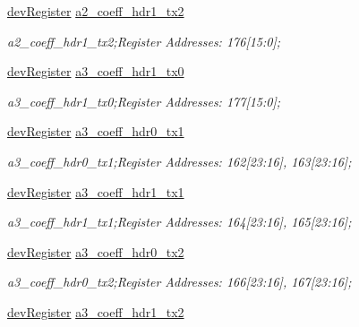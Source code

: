 \begin{DoxyCompactItemize}
\mbox{\hyperlink{classdev_register}{dev\+Register}} \mbox{\hyperlink{class_o_p_t3101_registers_a36a3f5b6e254c0e3b7249b22f0d83378}{a2\+\_\+coeff\+\_\+hdr1\+\_\+tx2}}
\begin{DoxyCompactList}\small\item\em a2\+\_\+coeff\+\_\+hdr1\+\_\+tx2;Register Addresses\+: 176\mbox{[}15\+:0\mbox{]}; \end{DoxyCompactList}\item 
\mbox{\hyperlink{classdev_register}{dev\+Register}} \mbox{\hyperlink{class_o_p_t3101_registers_a2f5467bf81575c1e2cfd24206cdebb65}{a3\+\_\+coeff\+\_\+hdr1\+\_\+tx0}}
\begin{DoxyCompactList}\small\item\em a3\+\_\+coeff\+\_\+hdr1\+\_\+tx0;Register Addresses\+: 177\mbox{[}15\+:0\mbox{]}; \end{DoxyCompactList}\item 
\mbox{\hyperlink{classdev_register}{dev\+Register}} \mbox{\hyperlink{class_o_p_t3101_registers_a30c9afa928337c116a2ab0257cf6c9a0}{a3\+\_\+coeff\+\_\+hdr0\+\_\+tx1}}
\begin{DoxyCompactList}\small\item\em a3\+\_\+coeff\+\_\+hdr0\+\_\+tx1;Register Addresses\+: 162\mbox{[}23\+:16\mbox{]}, 163\mbox{[}23\+:16\mbox{]}; \end{DoxyCompactList}\item 
\mbox{\hyperlink{classdev_register}{dev\+Register}} \mbox{\hyperlink{class_o_p_t3101_registers_a10d71a658f53af9e89e98b4b1643cb09}{a3\+\_\+coeff\+\_\+hdr1\+\_\+tx1}}
\begin{DoxyCompactList}\small\item\em a3\+\_\+coeff\+\_\+hdr1\+\_\+tx1;Register Addresses\+: 164\mbox{[}23\+:16\mbox{]}, 165\mbox{[}23\+:16\mbox{]}; \end{DoxyCompactList}\item 
\mbox{\hyperlink{classdev_register}{dev\+Register}} \mbox{\hyperlink{class_o_p_t3101_registers_a14387bafd3d67825868af4867f303ce7}{a3\+\_\+coeff\+\_\+hdr0\+\_\+tx2}}
\begin{DoxyCompactList}\small\item\em a3\+\_\+coeff\+\_\+hdr0\+\_\+tx2;Register Addresses\+: 166\mbox{[}23\+:16\mbox{]}, 167\mbox{[}23\+:16\mbox{]}; \end{DoxyCompactList}\item 
\mbox{\hyperlink{classdev_register}{dev\+Register}} \mbox{\hyperlink{class_o_p_t3101_registers_a9b39c52d2051f051106d10edb9cb308e}{a3\+\_\+coeff\+\_\+hdr1\+\_\+tx2}}

\end{DoxyCompactItemize}
